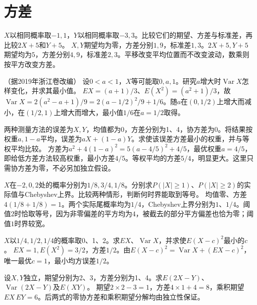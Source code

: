 \par\addvspace{12pt}

\section{方差}

\(X\)以相同概率取\(-1,1\)，\(Y\)以相同概率取\(-3,3\)。比较它们的期望、方差与标准差，再比较\(2X+5\)和\(Y+5\)。
\solutionanswer
\(X,Y\)期望均为零，方差分别\(1,9\)，标准差\(1,3\)。\(2X+5,Y+5\)期望均为\(5\)，方差分别\(4,9\)，标准差\(2,3\)。平移改变平均位置而不改变波动，数乘则按平方改变方差。


（据2019年浙江卷改编）
设\(0<a<1\)，\(X\)等可能取\(0,a,1\)。研究\(a\)增大时\(\operatorname{Var}X\)怎样变化，并求其最小值。
\solutionanswer
\(EX=(a+1)/3\)、\(E(X^2)=(a^2+1)/3\)，故\(\operatorname{Var}X=2(a^2-a+1)/9=2(a-1/2)^2/9+1/6\)。随\(a\)在\((0,1/2)\)上增大而减小，在\((1/2,1)\)上增大而增大，最小值\(1/6\)在\(a=1/2\)取得。


两种测量方法的误差为\(X,Y\)，均值都为0，方差分别为1、4，协方差为0。将结果按权重\(a,1-a\)平均，误差为\(aX+(1-a)Y\)。求使该误差方差最小的权重，并与等权平均比较。
\solutionanswer
方差为\(a^2+4(1-a)^2=5(a-4/5)^2+4/5\)，最优权重\(a=4/5\)，即给低方差方法较高权重，最小方差\(4/5\)。等权平均的方差\(5/4\)，明显更大。这里只需协方差为零，不必另加独立假设。


\(X\)在\(-2,0,2\)处的概率分别为\(1/8,3/4,1/8\)。分别求\(P(|X|\ge1)\)、\(P(|X|\ge2)\)的实际值与Chebyshev上界。比较两种情形，判断何时界能取到等号。
\solutionanswer
均值零、方差\(4(1/8+1/8)=1\)。两个实际尾概率均为\(1/4\)，Chebyshev上界分别为\(1\)、\(1/4\)。阈值\(2\)时恰取等号，因为非零偏差的平方均为\(4\)，被截去的部分平方偏差也恰为零；阈值\(1\)时界较宽。


\(X\)以\(1/4,1/2,1/4\)的概率取0、1、2。求\(EX\)、\(\operatorname{Var}X\)，并求使\(E(X-c)^2\)最小的\(c\)。
\solutionanswer
\(EX=1,E(X^2)=3/2\)，方差\(1/2\)。由\(E(X-c)^2=\operatorname{Var}X+(EX-c)^2\)，唯一最优\(c=1\)，最小均方误差\(1/2\)。


设\(X,Y\)独立，期望分别为2、3，方差分别为1、4。求\(E(2X-Y)\)、\(\operatorname{Var}(2X-Y)\)及\(E(XY)\)。
\solutionanswer
期望\(2\times2-3=1\)，方差\(4\times1+4=8\)，乘积期望\(EX\,EY=6\)。后两式的零协方差和乘积期望分解均由独立性保证。


